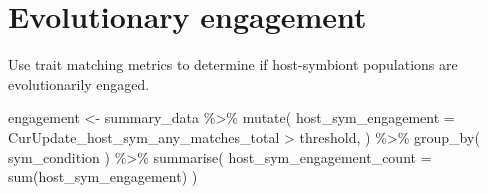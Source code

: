 \documentclass[
]{book}
\newenvironment{Shaded}{\begin{snugshade}}{\end{snugshade}}
\newcommand{\AttributeTok}[1]{\textcolor[rgb]{0.77,0.63,0.00}{#1}}
\newcommand{\FunctionTok}[1]{\textcolor[rgb]{0.00,0.00,0.00}{#1}}
\newcommand{\NormalTok}[1]{#1}
\newcommand{\OtherTok}[1]{\textcolor[rgb]{0.56,0.35,0.01}{#1}}
\newcommand{\SpecialCharTok}[1]{\textcolor[rgb]{0.00,0.00,0.00}{#1}}
\begin{document}
\hypertarget{evolutionary-engagement}{%
\section{Evolutionary engagement}\label{evolutionary-engagement}}

Use trait matching metrics to determine if host-symbiont populations are evolutionarily engaged.

\begin{Shaded}
\begin{Highlighting}[]
\NormalTok{engagement }\OtherTok{\textless{}{-}}\NormalTok{ summary\_data }\SpecialCharTok{\%\textgreater{}\%}
  \FunctionTok{mutate}\NormalTok{(}
    \AttributeTok{host\_sym\_engagement =}\NormalTok{ CurUpdate\_host\_sym\_any\_matches\_total }\SpecialCharTok{\textgreater{}}\NormalTok{ threshold,}
\NormalTok{  ) }\SpecialCharTok{\%\textgreater{}\%}
  \FunctionTok{group\_by}\NormalTok{(}
\NormalTok{    sym\_condition}
\NormalTok{  ) }\SpecialCharTok{\%\textgreater{}\%}
  \FunctionTok{summarise}\NormalTok{(}
    \AttributeTok{host\_sym\_engagement\_count =} \FunctionTok{sum}\NormalTok{(host\_sym\_engagement)}
\NormalTok{  )}
\end{Highlighting}
\end{Shaded}
\end{document}
